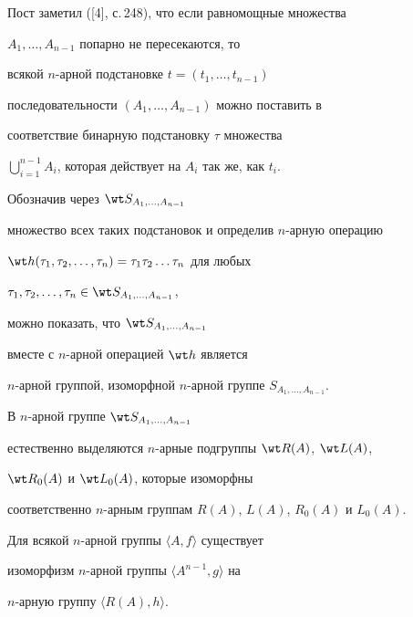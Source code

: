 Пост заметил ([4], с.\,248), что если равномощные множества


$A_1,\dotsc,A_{n-1}$ попарно не пересекаются, то


всякой $n$-арной подстановке  $t=(t_1,\dotsc,t_{n-1})$


последовательности $(A_1,\dotsc, A_{n-1})$ можно поставить в


соответствие бинарную подстановку $\tau$ множества


$\bigcup\limits_{i=1}^{n-1}A_i$, которая действует на $A_i$ так же, как $t_i$.


Обозначив через $\wt S_{A_1,\dotsc,A_{n-1}}$


множество всех таких подстановок и определив $n$-арную операцию


$\wt h(\tau_1,\tau_2,\dotsc,\tau_n)=\tau_1\tau_2\dotsc\tau_n$ для любых


$\tau_1,\tau_2,\dotsc, \tau_n\in \wt S_{A_1,\dotsc,A_{n-1}}$,


можно показать, что $\wt S_{A_1,\dotsc,A_{n-1}}$


вместе с $n$-арной операцией $\wt h$ является


$n$-арной группой, изоморфной $n$-арной группе $S_{A_1,\dotsc,A_{n-1}}$.





В $n$-арной группе $\wt S_{A_1,\dotsc,A_{n-1}}$


естественно выделяются $n$-арные подгруппы $\wt R(A)$, $\wt L(A)$,


$\wt R_0(A)$ и $\wt L_0(A)$, которые изоморфны


соответственно $n$-арным группам $R(A)$, $L(A)$, $R_0(A)$ и $L_0(A)$.





\begin{thm}


Для всякой $n$-арной группы $\langle A,f\rangle $ существует


изоморфизм $n$-арной группы $\langle A^{n-1},g\rangle $ на


$n$-арную группу $\langle R(A),h\rangle $.


\end{thm}





